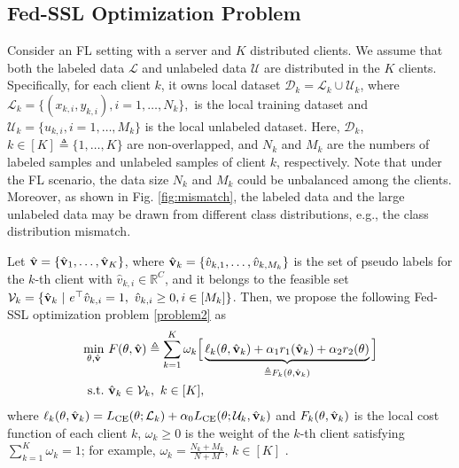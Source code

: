 \documentclass[twoside,journal]{IEEEtran}
\def\VectorFont{\bf}
\newcommand{\vv}{{\VectorFont v}}
\begin{document}
\subsection{Fed-SSL Optimization Problem}
Consider an FL setting with a server and $K$ distributed clients.
We assume that both the labeled data $\mathcal{L}$ and unlabeled data $\mathcal{U}$ are distributed in the $K$ clients.
Specifically, for each client $k$, it owns local dataset $\mathcal{D}_k=\mathcal{L}_k\cup \mathcal{U}_k$, where
$
\mathcal{L}_k=\{(x_{k,i},y_{k,i}), i=1,\ldots,N_k\},
$ is the local training dataset and
$\mathcal{U}_k=\{ u_{k,i}, i=1,\ldots,M_k\}
$ is the local unlabeled dataset.
Here, $\mathcal{D}_k$, $k\in[K]\triangleq\{1,\ldots,K\}$ are non-overlapped, and
$N_k$ and $M_k$ are the numbers of labeled samples and unlabeled samples of client $k$, respectively.
Note that under the FL scenario, the data size $N_k$ and $M_k$ could be unbalanced among the clients. Moreover, as shown in Fig. \ref{fig:mismatch}, the labeled data and the large unlabeled data may  be drawn from different class distributions, e.g., the class distribution mismatch.

Let $\hat{\vv}=\{\hat{\vv}{_1},\ldots,\hat{\vv}{_K}\}$, where $\hat{\vv}{_k}=\{\hat{v}_{k,1},\ldots,\hat{v}_{k,M_k}\}$ is the set of pseudo labels for the $k$-th client with $\hat{v}_{k,i}\in\mathbb{R}^C$, and it belongs to the feasible set $\mathcal{V}_k=\{\hat{\vv}_k~|~e^\top\hat{v}_{k,i}=1,~\hat{v}_{k,i}\geq0, i\in [M_k]\}$. Then, we propose the following Fed-SSL optimization problem
\eqref{problem2} as
\begin{subequations}\label{dist prob}
	\begin{align}
	\min_{ \substack{\theta,\hat{\vv}}}~ &  F(\theta,\hat{\vv})\triangleq \sum_{k=1}^K\omega_k\Big[\underbrace{\ell_k(\theta,\hat{\vv}_k)
+\alpha_1r_1(\hat{\vv}_k)+\alpha_2r_2({\theta})}_{\triangleq F_k(\theta,\hat{\vv}_k)}\Big]\label{eqn: FW_joint_obj} \\
	{\rm s.t.}~ & \hat{\vv}_k\in\mathcal{V}_k,~ k\in [K],   \label{eqn: FW_joint_c}
	\end{align}
\end{subequations}
where
$\ell_k(\theta,\hat{\vv}_k)=L_{\rm CE}(\theta;\mathcal{L}_k)+\alpha_0 L_{\rm CE}(\theta; \mathcal{U}_k, \hat{\vv}_k)$ and $F_k(\theta,\hat{\vv}_k)$
is the local cost function of each client $k$,  $\omega_k\geq 0$ is the weight of the $k$-th client satisfying $\sum_{k=1}^K\omega_k=1$; for example,  $\omega_k = \frac{N_k+M_k}{N+M}$, $k\in [K]$ \cite{chang2017distributed}.
\end{document}
